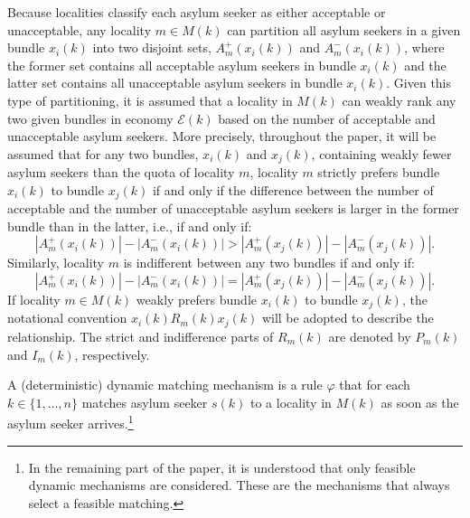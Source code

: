 \documentclass[12pt,fleqn]{article}
\begin{document}
Because localities classify each asylum seeker as either acceptable or unacceptable, any locality $m\in M(k)$ can partition all asylum seekers in a given bundle $x_i(k)$ into two disjoint sets, $A^+_m(x_i(k))$ and $A^-_m(x_i(k))$, where the former set contains all acceptable asylum seekers in bundle $x_i(k)$ and the latter set contains all unacceptable asylum seekers in bundle $x_i(k)$. Given this type of partitioning, it is assumed that a locality in $M(k)$ can weakly rank any two given bundles in economy $\mathcal{E}(k)$ based on the number of acceptable and unacceptable asylum seekers. More precisely, throughout the paper, it will be assumed that for any two bundles, $x_i(k)$ and $x_j(k)$, containing weakly fewer asylum seekers than the quota of locality $m$, locality $m$ strictly prefers bundle $x_i(k)$ to bundle $x_j(k)$ if and only if the difference between the number of acceptable and the number of unacceptable asylum seekers is larger in the former bundle than in the latter, i.e., if and only if:
\begin{equation}
|A_m^+(x_i(k))|-|A_m^-(x_i(k))|>|A_m^+(x_j(k))|-|A_m^-(x_j(k))|.\label{EQ:preference}
\end{equation}
\noindent Similarly, locality $m$ is indifferent between any two bundles if and only if:
\begin{equation}
|A_m^+(x_i(k))|-|A_m^-(x_i(k))|=|A_m^+(x_j(k))|-|A_m^-(x_j(k))|.
\end{equation}
\noindent If locality $m\in M(k)$ weakly prefers bundle $x_i(k)$ to bundle $x_j(k)$, the notational convention $x_i(k)R_m(k) x_j(k)$ will be adopted to describe the relationship. The strict and indifference parts of $R_m(k)$ are denoted by $P_m(k)$ and $I_m(k)$, respectively.

A (deterministic) dynamic matching mechanism is a rule $\varphi$ that for each $k\in\{1,\ldots,n\}$ matches asylum seeker $s(k)$ to a locality in $M(k)$ as soon as the asylum seeker arrives.\footnote{In the remaining part of the paper, it is understood that only feasible dynamic mechanisms are considered. These are the mechanisms that always select a feasible matching.}
\end{document}

